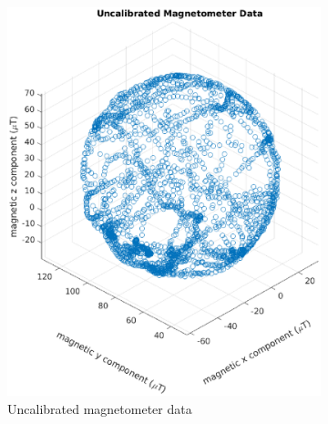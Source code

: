 \begin{figure}[H]
	\centering
	\begin{subfigure}[t]{.4\textwidth}
		\centering
		\includegraphics[width=\linewidth]{images/20201020_1125_Uncalibrated_Magnetometer_Data}
		\caption{Uncalibrated magnetometer data}
		\label{fig:uncalibrated_magnetometer_data}
	\end{subfigure}
	\begin{subfigure}[t]{0.4\textwidth}
		\centering

\end{subfigure}
\end{figure}
